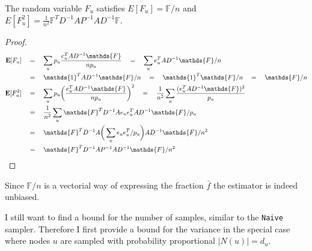 \begin{lemma}
  The random variable $F_u$ satisfies $E[F_u] = \mathds{F}/n$ and \\
  $E[F_u^2] = \frac{1}{n^2}\mathds{F}^TD^{-1}AP^{-1}AD^{-1}\mathds{F}$.
\end{lemma}
\begin{proof}
\begin{align*}
\textbf{E}[F_u] \quad&=\quad \sum_u p_u \frac{e_u^TAD^{-1}\mathds{F}}{np_u} \quad=\quad \sum_u e_u^TAD^{-1}\mathds{F}/n \\
&=\quad\mathds{1}^TAD^{-1}\mathds{F}/n \quad=\quad \mathds{1}^T\mathds{F}/n \quad=\quad \mathds{F}/n \\
\textbf{E}[F_u^2] \quad&=\quad \sum_u p_u \bigg(\frac{e_u^TAD^{-1}\mathds{F}}{np_u}\bigg)^2 \quad=\quad \frac{1}{n^2}\sum_u \frac{(e_u^TAD^{-1}\mathds{F})^2}{p_u} \\
&=\quad\frac{1}{n^2}\sum_u \mathds{F}^TD^{-1}Ae_ue_u^TAD^{-1}\mathds{F}/p_u \\
&=\quad \mathds{F}^TD^{-1}A\bigg(\sum_ue_ue_u^T/p_u\bigg)AD^{-1}\mathds{F}/n^2 \\
&=\quad \mathds{F}^TD^{-1}AP^{-1}AD^{-1}\mathds{F}/n^2 \qedhere
\end{align*}
\end{proof}
Since $\mathds{F}/n$ is a vectorial way of expressing the fraction $\bar{f}$ the estimator is indeed unbiased.

I still want to find a bound for the number of samples, similar to the \texttt{Naive} sampler.
Therefore I first provide a bound for the variance in the special case where nodes $u$ are sampled with probability proportional $|N(u)| = d_u$.

